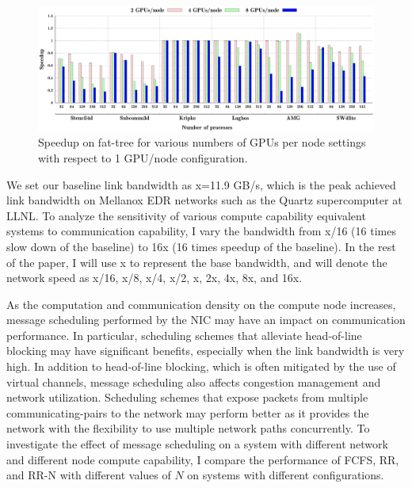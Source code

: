 \begin{figure}[t]
\centering
\includegraphics[width=\textwidth]{plots/ftree/map/ftree-mapping-all.eps}
\caption{Speedup on fat-tree for various numbers of GPUs per node settings with
respect to 1 GPU/node configuration.}
\label{fig:ftree_gpu}
\end{figure}

\vspace{0.08in}
We set our baseline link bandwidth as x=11.9 GB/s, which is the peak achieved
link bandwidth on Mellanox EDR networks such as
the Quartz supercomputer at LLNL. To analyze the
sensitivity of various compute capability equivalent systems to communication capability, I vary the bandwidth
from x/16 (16 times slow down of the baseline) to 16x (16 times speedup of the
baseline). In the rest of the paper, I will use x to represent the base
bandwidth, and will denote the network speed as x/16, x/8, x/4, x/2, x, 2x, 4x,
8x, and 16x.  


\vspace{0.08in}
As the computation and communication density
on the compute node increases, message scheduling performed by the
NIC may have an impact on
communication performance. In particular, scheduling schemes that alleviate
head-of-line blocking may have significant benefits, especially when the link
bandwidth is very high. In addition to head-of-line blocking, which is often mitigated
by the use of virtual channels, message scheduling also affects congestion management and network
utilization. Scheduling schemes that expose packets from multiple communicating-pairs
to the network may perform better as it provides the network with the flexibility to
use multiple network paths concurrently. To investigate the effect of message scheduling
on a system with different network and different node compute capability, I compare the performance
of FCFS, RR, and RR-N with different values of $N$ on systems with different configurations. 

